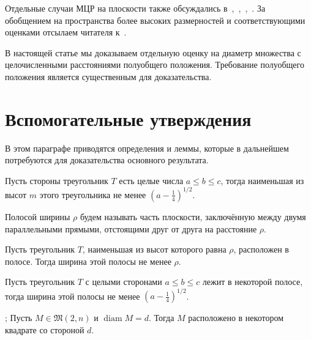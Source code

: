 \documentclass[11pt,twoside,draft
]{article}
\begin{document}
Отдельные случаи МЦР на плоскости также обсуждались
в~\cite[\S 5.11]{brass2006research},~\cite[\S D20]{guy2013unsolved},~\cite{our-pmm-2018},~\cite{our-ped-2018}.
За обобщением на пространства более высоких размерностей и соответствующими оценками
отсылаем читателя к~\cite{kurz2005characteristic,nozaki2013lower}.

В настоящей статье мы доказываем отдельную оценку на диаметр множества с целочисленными расстояниями полуобщего положения.
Требование полуобщего положения является существенным для доказательства.



\section{Вспомогательные утверждения}

В этом параграфе приводятся определения и леммы, которые в дальнейшем потребуются
для доказательства основного результата.


\begin{lemm}
	\cite[наблюдение 1]{solymosi2003note}
	Пусть стороны треугольник $T$ есть целые числа $a \leq b \leq c$,
	тогда наименьшая из высот $m$ этого треугольника не менее $\left(a - \frac{1}{4}\right)^{1/2}$.
\end{lemm}

\begin{definition}
	Полосой ширины $\rho$ будем называть часть плоскости,
	заключённую между двумя параллельными прямыми,
	отстоящими друг от друга на расстояние $\rho$.
\end{definition}

\begin{lemm}
	\cite{smurov1998stripcoverings}
	Пусть треугольник $T$, наименьшая из высот которого равна $\rho$, расположен в полосе.
	Тогда ширина этой полосы не менее $\rho$.
\end{lemm}

\begin{corollary}
	\label{cor:solymosi_strip}
	Пусть треугольник $T$ с целыми сторонами $a \leq b \leq c$ лежит в некоторой полосе,
	тогда ширина этой полосы не менее $\left(a - \frac{1}{4}\right)^{1/2}$.
\end{corollary}


\begin{lemm}
	\cite[лемма 4]{our-vmmsh-2018};
	\cite[лемма 2.4]{my-pps-linear-bound-2019}
	\label{lem:square_container}
	Пусть $M\in\mathfrak{M}(2,n)$ и $\operatorname{diam} M = d$.
	Тогда $M$ расположено в некотором квадрате со стороной $d$.
\end{lemm}
\end{document}
